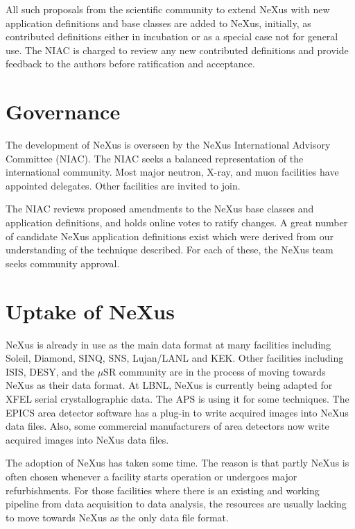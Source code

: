 \documentclass[%
 aip,
rsi,
 amsmath,amssymb,
 reprint,%
]{revtex4-1}
\begin{document}
All such proposals from the scientific community to extend NeXus 
with new application definitions and base classes are added to 
NeXus, initially, as contributed definitions either in incubation 
or as a special case not for general use. The NIAC is charged to 
review any new contributed definitions and provide feedback to the 
authors before ratification and acceptance.


\section{Governance}
  \label{sect_gov}

The development of NeXus is overseen
by the NeXus International Advisory Committee (NIAC)\cite{niac}.
The NIAC seeks a balanced representation of the international community.
Most major neutron, X-ray, and muon facilities have appointed delegates.
Other facilities are invited to join.

The NIAC reviews proposed amendments to the NeXus base classes and
application definitions, and holds online votes to ratify changes.
A great number of candidate NeXus application definitions exist which were derived from our understanding of the technique described.
For each of these, the NeXus team seeks community approval. 


\section{Uptake of NeXus} 

NeXus is already in use as the main data format at many facilities including Soleil, Diamond, SINQ, SNS, Lujan/LANL 
and KEK. Other facilities including ISIS, DESY, and the $\mu$SR community are in the process of moving towards 
NeXus as their data format. At LBNL, NeXus is currently being adapted for XFEL 
serial crystallographic data. The APS is using it for some techniques. 
The EPICS\cite{epicsad} area detector software has a plug-in to write acquired images into NeXus data files.
Also, some commercial manufacturers of area detectors now write acquired images into NeXus data files.

The adoption of NeXus has taken some time. The reason is that partly NeXus is often chosen whenever 
a facility starts operation or undergoes major refurbishments. For those facilities where there is an existing and working 
pipeline from data acquisition to data analysis,  the resources are usually lacking to move 
towards NeXus as the only data file format. 
\end{document}
